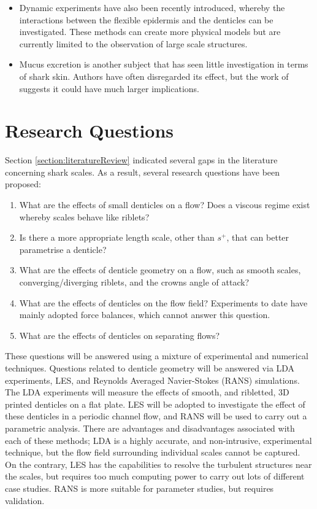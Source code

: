 \documentclass[12pt,oneside,a4paper]{article}
\begin{document}
\begin{itemize}
%
\item Dynamic experiments have also been recently introduced, whereby the interactions between the flexible epidermis and the denticles can be investigated. These methods can create more physical models but are currently limited to the observation of large scale structures. 
%
\item Mucus excretion is another subject that has seen little investigation in terms of shark skin. Authors have often disregarded its effect, but the work of \cite{zhang2011b} suggests it could have much larger implications. 
%
\end{itemize}

\section{Research Questions}

Section \ref{section:literatureReview} indicated several gaps in the literature concerning shark scales. As a result, several research questions have been proposed:
\begin{enumerate}
\item What are the effects of small denticles on a flow? Does a viscous regime exist whereby scales behave like riblets?
\item Is there a more appropriate length scale, other than $s^+$, that can better parametrise a denticle?
\item What are the effects of denticle geometry on a flow, such as smooth scales, converging/diverging riblets, and the crowns angle of attack?
\item What are the effects of denticles on the flow field? Experiments to date have mainly adopted force balances, which cannot answer this question.
\item What are the effects of denticles on separating flows?
\end{enumerate}

These questions will be answered using a mixture of experimental and numerical techniques. Questions related to denticle geometry will be answered via LDA experiments, LES, and Reynolds Averaged Navier-Stokes (RANS) simulations. The LDA experiments will measure the effects of smooth, and ribletted, 3D printed denticles on a flat plate. LES will be adopted to investigate the effect of these denticles in a periodic channel flow, and RANS will be used to carry out a parametric analysis. There are advantages and disadvantages associated with each of these methods; LDA is a highly accurate, and non-intrusive, experimental technique, but the flow field surrounding individual scales cannot be captured. On the contrary, LES has the capabilities to resolve the turbulent structures near the scales, but requires too much computing power to carry out lots of different case studies. RANS is more suitable for parameter studies, but requires validation. 
\end{document}
